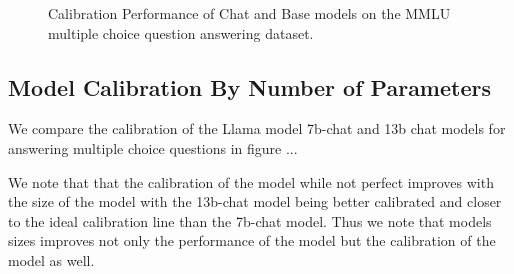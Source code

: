 \documentclass[11pt]{article}
\begin{document}
\begin{figure}
        \caption{Calibration Performance of Chat and Base models on the MMLU multiple choice question answering dataset.}
        \label{fig:three graphs}
\end{figure}


\subsection{Model Calibration By Number of Parameters}

We compare the calibration of the Llama \cite{touvron2023llama} model 
7b-chat and 13b chat models for answering multiple choice questions in 
figure ... 

We note that that the calibration of the model while not perfect improves 
with the size of the model with the 13b-chat model being better calibrated 
and closer to the ideal calibration line than the 7b-chat model. Thus we 
note that models sizes improves not only the performance of the model but
the calibration of the model as well.
\end{document}

